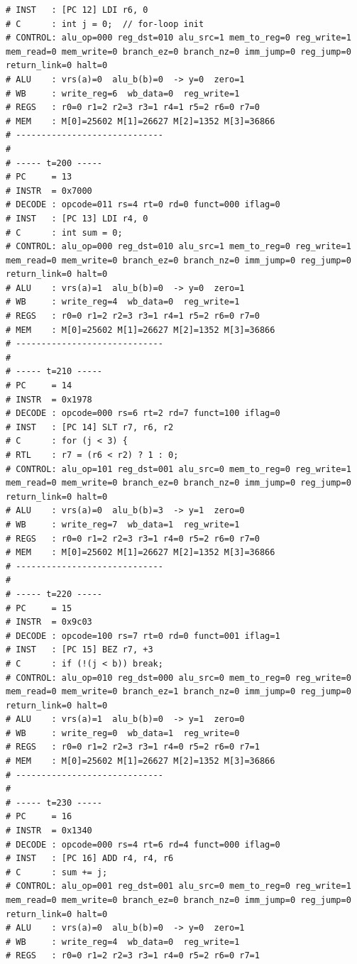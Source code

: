 \documentclass[12pt]{report}
\begin{document}
\begin{lstlisting}
# INST   : [PC 12] LDI r6, 0
# C      : int j = 0;  // for-loop init
# CONTROL: alu_op=000 reg_dst=010 alu_src=1 mem_to_reg=0 reg_write=1 mem_read=0 mem_write=0 branch_ez=0 branch_nz=0 imm_jump=0 reg_jump=0 return_link=0 halt=0
# ALU    : vrs(a)=0  alu_b(b)=0  -> y=0  zero=1
# WB     : write_reg=6  wb_data=0  reg_write=1
# REGS   : r0=0 r1=2 r2=3 r3=1 r4=1 r5=2 r6=0 r7=0
# MEM    : M[0]=25602 M[1]=26627 M[2]=1352 M[3]=36866
# -----------------------------
# 
# ----- t=200 -----
# PC     = 13
# INSTR  = 0x7000
# DECODE : opcode=011 rs=4 rt=0 rd=0 funct=000 iflag=0
# INST   : [PC 13] LDI r4, 0
# C      : int sum = 0;
# CONTROL: alu_op=000 reg_dst=010 alu_src=1 mem_to_reg=0 reg_write=1 mem_read=0 mem_write=0 branch_ez=0 branch_nz=0 imm_jump=0 reg_jump=0 return_link=0 halt=0
# ALU    : vrs(a)=1  alu_b(b)=0  -> y=0  zero=1
# WB     : write_reg=4  wb_data=0  reg_write=1
# REGS   : r0=0 r1=2 r2=3 r3=1 r4=1 r5=2 r6=0 r7=0
# MEM    : M[0]=25602 M[1]=26627 M[2]=1352 M[3]=36866
# -----------------------------
# 
# ----- t=210 -----
# PC     = 14
# INSTR  = 0x1978
# DECODE : opcode=000 rs=6 rt=2 rd=7 funct=100 iflag=0
# INST   : [PC 14] SLT r7, r6, r2
# C      : for (j < 3) {
# RTL    : r7 = (r6 < r2) ? 1 : 0;
# CONTROL: alu_op=101 reg_dst=001 alu_src=0 mem_to_reg=0 reg_write=1 mem_read=0 mem_write=0 branch_ez=0 branch_nz=0 imm_jump=0 reg_jump=0 return_link=0 halt=0
# ALU    : vrs(a)=0  alu_b(b)=3  -> y=1  zero=0
# WB     : write_reg=7  wb_data=1  reg_write=1
# REGS   : r0=0 r1=2 r2=3 r3=1 r4=0 r5=2 r6=0 r7=0
# MEM    : M[0]=25602 M[1]=26627 M[2]=1352 M[3]=36866
# -----------------------------
# 
# ----- t=220 -----
# PC     = 15
# INSTR  = 0x9c03
# DECODE : opcode=100 rs=7 rt=0 rd=0 funct=001 iflag=1
# INST   : [PC 15] BEZ r7, +3
# C      : if (!(j < b)) break;
# CONTROL: alu_op=010 reg_dst=000 alu_src=0 mem_to_reg=0 reg_write=0 mem_read=0 mem_write=0 branch_ez=1 branch_nz=0 imm_jump=0 reg_jump=0 return_link=0 halt=0
# ALU    : vrs(a)=1  alu_b(b)=0  -> y=1  zero=0
# WB     : write_reg=0  wb_data=1  reg_write=0
# REGS   : r0=0 r1=2 r2=3 r3=1 r4=0 r5=2 r6=0 r7=1
# MEM    : M[0]=25602 M[1]=26627 M[2]=1352 M[3]=36866
# -----------------------------
# 
# ----- t=230 -----
# PC     = 16
# INSTR  = 0x1340
# DECODE : opcode=000 rs=4 rt=6 rd=4 funct=000 iflag=0
# INST   : [PC 16] ADD r4, r4, r6
# C      : sum += j;
# CONTROL: alu_op=001 reg_dst=001 alu_src=0 mem_to_reg=0 reg_write=1 mem_read=0 mem_write=0 branch_ez=0 branch_nz=0 imm_jump=0 reg_jump=0 return_link=0 halt=0
# ALU    : vrs(a)=0  alu_b(b)=0  -> y=0  zero=1
# WB     : write_reg=4  wb_data=0  reg_write=1
# REGS   : r0=0 r1=2 r2=3 r3=1 r4=0 r5=2 r6=0 r7=1

\end{lstlisting}
\end{document}
